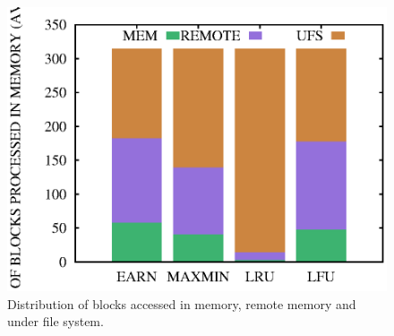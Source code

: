 \documentclass[10pt,conference,letterpaper]{IEEEtran}
\begin{document}
\begin{figure}[!htbp]
{\begin{minipage}[b]{0.25\linewidth}
        \includegraphics[scale=0.2]{figures/block_count_avg_two.eps}
        \end{minipage}
    }
    \caption{Distribution of blocks accessed in memory, remote memory and under file system.}
    \label{fig:block_count}
\end{figure}
\end{document}
